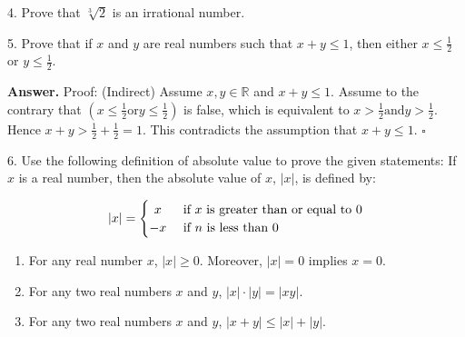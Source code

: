 \documentclass[10pt,]{book}
\theoremstyle{plain}
\theoremstyle{definition}
\theoremstyle{definition}
\theoremstyle{definition}
\theoremstyle{definition}
\begin{document}
\begin{exercisegroup}
\item[4.]\hypertarget{exercise-67}{}Prove that \(\sqrt[3]{2}\) is an irrational number.
%
\par\smallskip
\item[5.]\hypertarget{exercise-68}{}Prove that if \(x\) and \(y\) are real numbers such that \(x + y \leq  1\), then either  \(x\leq \frac{1}{2}\) or \(y\leq  \frac{1}{2}\).
%
\par\smallskip
\par\smallskip
\noindent\textbf{Answer.}\hypertarget{answer-31}{}\quad
 Proof: (Indirect) Assume \(x,y\in \mathbb{R}\) and \(x+y\leqslant 1\). Assume to the contrary that \(\left(x\leqslant \frac{1}{2}\text{or} y\leqslant \frac{1}{2}\right)\) is false, which is equivalent to \(x>\frac{1}{2}\text{and} y>\frac{1}{2}\). Hence \(x+y>\frac{1}{2}+\frac{1}{2}=1\). This contradicts the assumption that \(x+y\leqslant 1\). \(\square\)%
\item[6.]\hypertarget{exercise-69}{}Use the following definition of absolute value to prove the given statements: If \(x\) is a real number, then the absolute value of
\(x\), \(\lvert x \rvert\), is defined by:

\[
 \lvert x \rvert =
  \begin{cases} 
      \hfill x    \hfill & \text{ if $x$ is greater than or equal to 0} \\
      \hfill -x \hfill & \text{ if $n$ is less than 0} \\
  \end{cases}
\]%
\par
\leavevmode%
\begin{enumerate}[label=\alph*]
\item\hypertarget{li-336}{} For any real number \(x\), \(\lvert x \rvert\geq 0\). Moreover, \(\lvert  x  \rvert = 0\) implies \(x = 0\).%
\item\hypertarget{li-337}{}For any two real numbers \(x\) and \(y\), \(\lvert x \rvert\cdot  \lvert y \rvert=\lvert  x y \rvert\).%
\item\hypertarget{li-338}{}For any two real numbers \(x\) and \(y\), \(\lvert x + y \rvert\leq  \lvert x \rvert + \lvert y \rvert\).%
\end{enumerate}
%
\par\smallskip
\end{exercisegroup}
\par\smallskip\noindent
%
\backmatter
%
%
%
\typeout{************************************************}
\typeout{************************************************}
\end{document}
